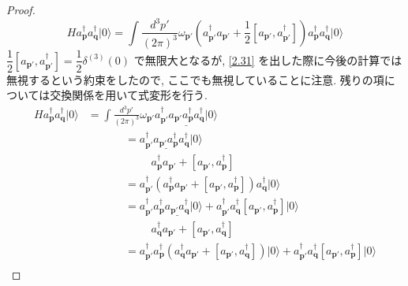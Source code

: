 \documentclass[a4paper,12pt]{article}
\begin{document}
\begin{proof}
\begin{equation*}
    H a_{\mathbf{p}}^{\dagger} a_{\mathbf{q}}^{\dagger} \lvert 0 \rangle = \int \frac{d^3 p'}{(2\pi)^3} \omega_{\mathbf{p}'} \left( a^\dagger_{\mathbf{p}'}a_{\mathbf{p}'} + \frac{1}{2} [a_{\mathbf{p}'}, a^\dagger_{\mathbf{p}'}] \right) a_{\mathbf{p}}^{\dagger} a_{\mathbf{q}}^{\dagger} \lvert 0 \rangle \tag{2-3.m1}
\end{equation*}
$\dfrac{1}{2}[a_{\mathbf{p}'}, a^\dagger_{\mathbf{p}'}] = \dfrac{1}{2}\delta^{(3)}(0)$ で無限大となるが, \eqref{2.31} を出した際に今後の計算では無視するという約束をしたので, ここでも無視していることに注意. 残りの項については交換関係を用いて式変形を行う.
\begin{align*}
    H a_{\mathbf{p}}^{\dagger} a_{\mathbf{q}}^{\dagger} \lvert 0 \rangle &= \int \frac{d^3 p'}{(2\pi)^3} \omega_{\mathbf{p}'} \underline{a^\dagger_{\mathbf{p}'}a_{\mathbf{p}'} a_{\mathbf{p}}^{\dagger} a_{\mathbf{q}}^{\dagger} \lvert 0 \rangle} \tag{2-3.m2}\\
    &\quad \hspace{1cm} = a^\dagger_{\mathbf{p}'} \underline{a_{\mathbf{p}'} a_{\mathbf{p}}^{\dagger}} a_{\mathbf{q}}^{\dagger} \lvert 0 \rangle \tag{2-3.m3}\\
    &\quad \hspace{2cm} a_{\mathbf{p}}^{\dagger} a_{\mathbf{p}'} + [a_{\mathbf{p}'}, a_{\mathbf{p}}^{\dagger}] \tag{2-3.m4}\\
    &\quad \hspace{1cm} = a^\dagger_{\mathbf{p}'} (a_{\mathbf{p}}^{\dagger} a_{\mathbf{p}'} + [a_{\mathbf{p}'}, a_{\mathbf{p}}^{\dagger}]) a_{\mathbf{q}}^{\dagger} \lvert 0 \rangle \tag{2-3.m5}\\
    &\quad \hspace{1cm} = a_{\mathbf{p}'}^{\dagger} a_{\mathbf{p}}^{\dagger} \underline{a_{\mathbf{p}'}a_{\mathbf{q}}^{\dagger}} \lvert 0 \rangle + a_{\mathbf{p}'}^{\dagger} a_{\mathbf{q}}^{\dagger} [a_{\mathbf{p}'}, a_{\mathbf{p}}^{\dagger}] \lvert 0 \rangle \tag{2-3.m6}\\
    &\quad \hspace{2cm} a_{\mathbf{q}}^{\dagger} a_{\mathbf{p}'} + [a_{\mathbf{p}'}, a_{\mathbf{q}}^{\dagger}] \tag{2-3.m7}\\
    &\quad \hspace{1cm} = a_{\mathbf{p}'}^{\dagger} a_{\mathbf{p}}^{\dagger} (a_{\mathbf{q}}^{\dagger} a_{\mathbf{p}'} + [a_{\mathbf{p}'}, a_{\mathbf{q}}^{\dagger}]) \lvert 0 \rangle + a_{\mathbf{p}'}^{\dagger} a_{\mathbf{q}}^{\dagger} [a_{\mathbf{p}'}, a_{\mathbf{p}}^{\dagger}] \lvert 0 \rangle \tag{2-3.m8}\\

\end{align*}
\end{proof}
\end{document}
